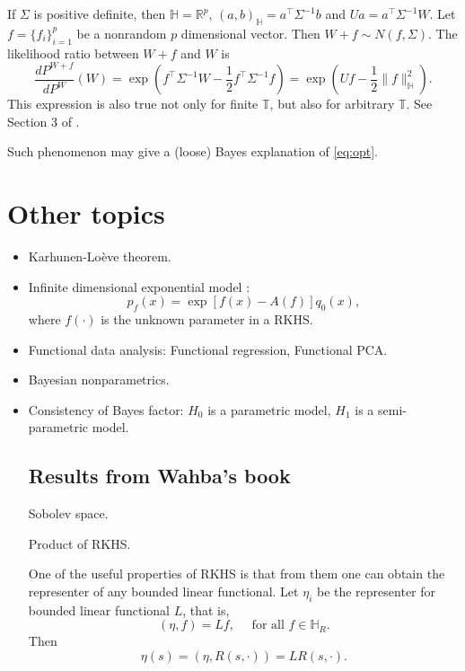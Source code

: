 \documentclass[11pt]{article}
\theoremstyle{plain}
\theoremstyle{definition}
\theoremstyle{remark}
\begin{document}
    If $\Sigma $ is positive definite, then $\mathbb H =\mathbb R^p$, $(a,b)_{\mathbb H}= a^\top \Sigma^{-1} b$ and $Ua=a^\top \Sigma^{-1} W $.
    Let $f=\{f_i\}_{i=1}^p$ be a nonrandom $p$ dimensional vector.
    Then $W+f\sim N(f,\Sigma)$. The likelihood ratio between $W+f$ and $W$ is
    \begin{equation*}
        \frac{dP^{W+f}}{dP^W} (W)=
        \exp\left(
            f^\top \Sigma^{-1} W -\frac{1}{2} f^\top \Sigma^{-1} f
        \right)
        =
        \exp\left(
            Uf -\frac{1}{2} \|f\|_{\mathbb H}^2
        \right).
    \end{equation*}
    This expression is also true not only for finite $\mathbb T$, but also for arbitrary $\mathbb T$. 
    See Section 3 of \cite{vandervaart}.


    Such phenomenon may give a (loose) Bayes explanation of \eqref{eq:opt}.









\section{Other topics}

\begin{itemize}
    \item 
        Karhunen-Lo\`eve theorem.
\item
    Infinite dimensional exponential model \cite{Bharath2017}:
    \begin{equation*}
        p_f(x)= \exp [f(x)-A(f)]  q_0 (x),
    \end{equation*}
    where $f(\cdot)$ is the unknown parameter in a RKHS.

\item 
    Functional data analysis: Functional regression, Functional PCA.
\item
     Bayesian nonparametrics.
 \item
     Consistency of Bayes factor: $H_0$ is a parametric model, $H_1$ is a semi-parametric model.


\subsection{Results from Wahba's book}
Sobolev space.

Product of RKHS.

One of the useful properties of RKHS is that from them one can obtain the representer of any bounded linear functional.
Let $\eta_i$ be the representer for bounded linear functional $L  $, that is,
\begin{equation*}
    (\eta, f)= L f,\quad \text{ for all $f\in \mathbb H_R$}.
\end{equation*}
Then 
\begin{equation*}
    \eta(s)=(\eta, R(s,\cdot))=L R(s,\cdot) .
\end{equation*}



\end{itemize}








\end{document}
